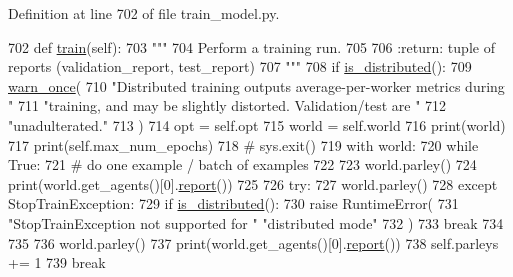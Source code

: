 Definition at line 702 of file train\+\_\+model.\+py.


\begin{DoxyCode}
702     \textcolor{keyword}{def }\hyperlink{namespaceprojects_1_1mastering__the__dungeon_1_1mturk_1_1tasks_1_1MTD_1_1run_a36a5f4f6f9df0611a6818610518d2cf0}{train}(self):
703         \textcolor{stringliteral}{"""}
704 \textcolor{stringliteral}{        Perform a training run.}
705 \textcolor{stringliteral}{}
706 \textcolor{stringliteral}{        :return: tuple of reports (validation\_report, test\_report)}
707 \textcolor{stringliteral}{        """}
708         \textcolor{keywordflow}{if} \hyperlink{namespaceparlai_1_1utils_1_1distributed_a023acb5e3b66e1f27e21247c35661279}{is\_distributed}():
709             \hyperlink{namespaceparlai_1_1utils_1_1misc_a884a3aefa90581f53bc592fa6a78dc43}{warn\_once}(
710                 \textcolor{stringliteral}{"Distributed training outputs average-per-worker metrics during "}
711                 \textcolor{stringliteral}{"training, and may be slightly distorted. Validation/test are "}
712                 \textcolor{stringliteral}{"unadulterated."}
713             )
714         opt = self.opt
715         world = self.world
716         print(world)
717         print(self.max\_num\_epochs)
718         \textcolor{comment}{# sys.exit()}
719         with world:
720             \textcolor{keywordflow}{while} \textcolor{keyword}{True}:
721                 \textcolor{comment}{# do one example / batch of examples}
722 
723                 world.parley()
724                 print(world.get\_agents()[0].\hyperlink{namespaceprojects_1_1convai2_1_1eval__f1_a01a47b9c08dad189837a51f085defc45}{report}())
725 
726                 \textcolor{keywordflow}{try}:
727                     world.parley()
728                 \textcolor{keywordflow}{except} StopTrainException:
729                     \textcolor{keywordflow}{if} \hyperlink{namespaceparlai_1_1utils_1_1distributed_a023acb5e3b66e1f27e21247c35661279}{is\_distributed}():
730                         \textcolor{keywordflow}{raise} RuntimeError(
731                             \textcolor{stringliteral}{"StopTrainException not supported for "} \textcolor{stringliteral}{"distributed mode"}
732                         )
733                     \textcolor{keywordflow}{break}
734 
735 
736                 world.parley()
737                 print(world.get\_agents()[0].\hyperlink{namespaceprojects_1_1convai2_1_1eval__f1_a01a47b9c08dad189837a51f085defc45}{report}())
738                 self.parleys += 1
739                 \textcolor{keywordflow}{break}

\end{DoxyCode}
